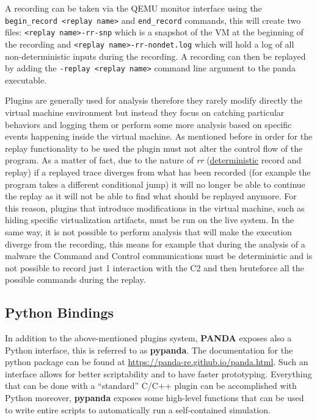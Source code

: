 A recording can be taken via the QEMU monitor interface using the \lstinline{begin_record <replay name>} and \lstinline{end_record} commands, this will create two files: \lstinline{<replay name>-rr-snp} which is a snapshot of the VM at the beginning of the recording and \lstinline{<replay name>-rr-nondet.log} which will hold a log of all non-deterministic inputs during the recording. A recording can then be replayed by adding the \lstinline{-replay <replay name>} command line argument to the panda executable. 

Plugins are generally used for analysis therefore they rarely modify directly the virtual machine environment but instead they focus on catching particular behaviors and logging them or perform some more analysis based on specific events happening inside the virtual machine. As mentioned before in order for the replay functionality to be used the plugin must not alter the control flow of the program. As a matter of fact, due to the nature of \textit{rr} (\underline{deterministic} record and replay) if a replayed trace diverges from what has been recorded (for example the program takes a different conditional jump) it will no longer be able to continue the replay as it will not be able to find what should be replayed anymore. For this reason, plugins that introduce modifications in the virtual machine, such as hiding specific virtualization artifacts, must be run on the live system. In the same way, it is not possible to perform analysis that will make the execution diverge from the recording, this means for example that during the analysis of a malware the Command and Control communications must be deterministic and is not possible to record just 1 interaction with the C2 and then bruteforce all the possible commands during the replay.


\subsection{Python Bindings}

In addition to the above-mentioned plugins system, \textbf{PANDA} exposes also a Python interface, this is referred to as \textbf{pypanda}. The documentation for the python package can be found at \url{https://panda-re.github.io/panda.html}. Such an interface allows for better scriptability and to have faster prototyping. Everything that can be done with a ``standard'' C/C++ plugin can be accomplished with Python moreover, \textbf{pypanda} exposes some high-level functions that can be used to write entire scripts to automatically run a self-contained simulation.

